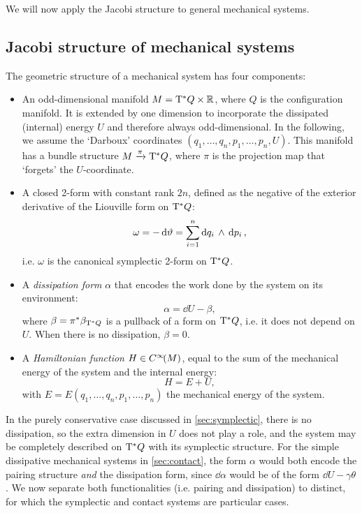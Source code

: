 We will now apply the Jacobi structure to general mechanical systems.

\subsection{Jacobi structure of mechanical systems}
The geometric structure of a mechanical system has four components:
\begin{itemize}
    \item An odd-dimensional manifold $M = \mathrm{T}^*Q\times \mathbb{R}$, where $Q$ is the configuration manifold. It is extended by one dimension to incorporate the dissipated (internal) energy $U$ and therefore always odd-dimensional. In the following, we assume the `Darboux' coordinates $(q_1, \ldots, q_n, p_1, \ldots, p_n, U)$.
    This manifold has a bundle structure $M\xrightarrow[]{\pi}\mathrm{T}^*Q$, where $\pi$ is the projection map that `forgets' the $U$-coordinate.
    \item A closed 2-form with constant rank $2n$, defined as the negative of the exterior derivative of the Liouville form on $\mathrm{T}^*Q$:
        $$ \omega = -\dd{\vartheta} = \sum^n_{i=1}  \dd{q_i}\,\wedge\,\dd{p_i} , $$
        i.e. $\omega$ is the canonical symplectic 2-form on $\mathrm{T}^*Q$.
    \item A \emph{dissipation form} $\alpha$ that encodes the work done by the system on its environment:
        $$ \alpha = \dd{U} - \beta, $$
        where $\beta = \pi^*\beta_{\mathrm{T}^*Q}$ is a pullback of a form on $\mathrm{T}^*Q$, i.e. it does not depend on $U$. When there is no dissipation, $\beta = 0$.
    \item A \emph{Hamiltonian function} $H \in C^\infty\!\qty(M)$, equal to the sum of the mechanical energy of the system and the internal energy:
        $$ H = E + U, $$
        with $E = E(q_1, \ldots, q_n, p_1, \ldots, p_n)$ the mechanical energy of the system.
\end{itemize}

In the purely conservative case discussed in \cref{sec:symplectic}, there is no dissipation, so the extra dimension in $U$ does not play a role, and the system may be completely described on $\mathrm{T}^*Q$ with its symplectic structure. For the simple dissipative mechanical systems in \cref{sec:contact}, the form $\alpha$ would both encode the pairing structure \emph{and} the dissipation form, since $\dd{\alpha}$ would be of the form $\dd{U} - \gamma \theta$.  We now separate both functionalities (i.e. pairing and dissipation) to distinct, for which the symplectic and contact systems are particular cases.

